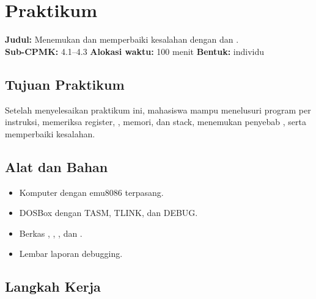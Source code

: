 \section{Praktikum}
\label{sec:praktikum-bab16}

\begin{praktikumbox}
\vspace{1.1em}
\textbf{Judul:} Menemukan dan memperbaiki kesalahan dengan
 dan .\\[0.3em]
\textbf{Sub-CPMK:} 4.1--4.3 \quad\textbullet\quad
\textbf{Alokasi waktu:} 100 menit \quad\textbullet\quad
\textbf{Bentuk:} individu
\end{praktikumbox}

\subsection{Tujuan Praktikum}

Setelah menyelesaikan praktikum ini, mahasiswa mampu menelusuri
program per instruksi, memeriksa register, , memori, dan
stack, menemukan penyebab , serta memperbaiki kesalahan.

\subsection{Alat dan Bahan}

\begin{itemize}
    \item Komputer dengan emu8086 terpasang.
    \item DOSBox dengan TASM, TLINK, dan DEBUG.
    \item Berkas , ,
          , dan .
    \item Lembar laporan debugging.
\end{itemize}

\subsection{Langkah Kerja}

